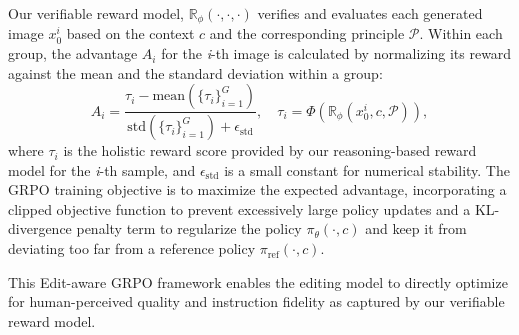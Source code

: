 Our verifiable reward model, $\mathbb{R}_\phi(\cdot,\cdot,\cdot)$ verifies and evaluates each generated image $x_0^i$ based on the context $c$ and the corresponding principle $\mathcal{P}$. 
Within each group, the advantage $A_i$ for the \textit{i}-th image is calculated by normalizing its reward against the mean and the standard deviation within a group:
\vspace{-0.5em}
\begin{equation}
A_i = \frac{\tau_i - \text{mean}\left(\{\tau_i\}_{i=1}^G\right)}{\text{std}\left(\{ \tau_i\}_{i=1}^G\right) + \epsilon_{\text{std}}},\quad \tau_i = \Phi\!\left(\mathbb{R}_\phi(x_0^i, c, \mathcal{P})\right),
\label{eq:advantage}
\end{equation}
where $\tau_i$ is the holistic reward score provided by our reasoning-based reward model for the \textit{i}-th sample, and $\epsilon_{\text{std}}$ is a small constant for numerical stability.
The GRPO training objective is to maximize the expected advantage, incorporating a clipped objective function to prevent excessively large policy updates and a KL-divergence penalty term to regularize the policy $\pi_\theta(\cdot,c)$ and keep it from deviating too far from a reference policy $\pi_{\text{ref}}(\cdot,c)$. 

This Edit-aware GRPO framework enables the editing model to directly optimize for human-perceived quality and instruction fidelity as captured by our verifiable reward model.






